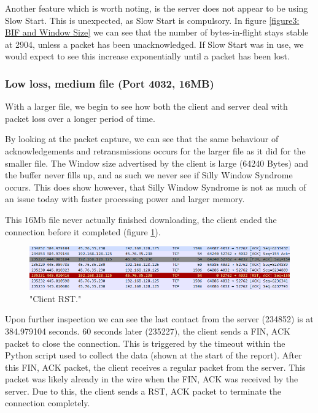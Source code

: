 \documentclass[12pt]{article}
\begin{document}
Another feature which is worth noting, is the server does not appear to be using Slow Start.
This is unexpected, as Slow Start is compulsory.
In figure \ref{figure3: BIF and Window Size} we can see that the number of bytes-in-flight stays stable at 2904, unless a packet has been unacknowledged.
If Slow Start was in use, we would expect to see this increase exponentially until a packet has been lost.

\subsubsection*{Low loss, medium file (Port 4032, 16MB)}
With a larger file, we begin to see how both the client and server deal with packet loss over a longer period of time.

By looking at the packet capture, we can see that the same behaviour of acknowledgements and retransmissions occurs for the larger file as it did for the smaller file.
The Window size advertised by the client is large (64240 Bytes) and the buffer never fills up, and as such we never see if Silly Window Syndrome occurs.
This does show however, that Silly Window Syndrome is not as much of an issue today with faster processing power and larger memory.

This 16Mb file never actually finished downloading, the client ended the connection before it completed (figure \ref{figure8: 4032:16M RST}).

\begin{figure}[!htbp]
  \centering
  \includegraphics[width=\linewidth]{4032-16M-RST.PNG}
  \caption{"Client RST."}
  \label{figure8: 4032:16M RST}
\end{figure}

Upon further inspection we can see the last contact from the server (234852) is at 384.979104 seconds.
60 seconds later (235227), the client sends a FIN, ACK packet to close the connection.
This is triggered by the timeout within the Python script used to collect the data (shown at the start of the report).
After this FIN, ACK packet, the client receives a regular packet from the server. 
This packet was likely already in the wire when the FIN, ACK was received by the server.
Due to this, the client sends a RST, ACK packet to terminate the connection completely.
\end{document}
